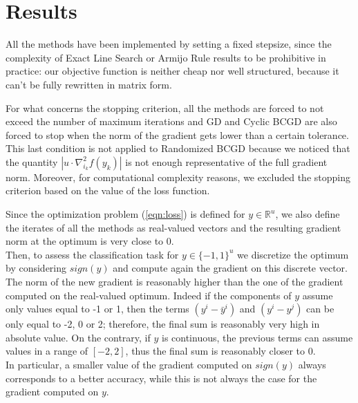 \documentclass[10pt,twocolumn,letterpaper]{article}
\begin{document}
\section{Results}
All the methods have been implemented by setting a fixed stepsize, since the complexity of Exact Line Search or Armijo Rule results to be prohibitive in practice: our objective function is neither cheap nor well structured, because it can't be fully rewritten in matrix form.

For what concerns the stopping criterion, all the methods are forced to not exceed the number of maximum iterations and GD and Cyclic BCGD are also forced to stop when the norm of the gradient gets lower than a certain tolerance. This last condition is not applied to Randomized BCGD because we noticed that the quantity $|u \cdot \nabla^2_{i_{k}}f(y_k)|$ is not enough representative of the full gradient norm. Moreover, for computational complexity reasons, we excluded the stopping criterion based on the value of the loss function.

Since the optimization problem (\ref{eqn:loss}) is defined for $y\in\mathbb{R}^u$, we also define the iterates of all the methods as real-valued vectors and the resulting gradient norm at the optimum is very close to 0. \\
Then, to assess the classification task for $y\in\{-1,1\}^u$ we discretize the optimum by considering $sign(y)$ and compute again the gradient on this discrete vector. The norm of the new gradient is reasonably higher than the one of the gradient computed on the real-valued optimum. Indeed if the components of $y$ assume only values equal to -1 or 1, then the terms $(y^i - \bar{y}^i)$ and $(y^i - y^j)$ can be only equal to -2, 0 or 2; therefore, the final sum is reasonably very high in absolute value. On the contrary, if $y$ is continuous, the previous terms can assume values in a range of $[-2, 2]$, thus the final sum is reasonably closer to 0.\\
In particular, a smaller value of the gradient computed on $sign(y)$ always corresponds to a better accuracy, while this is not always the case for the gradient computed on $y$.
\end{document}

